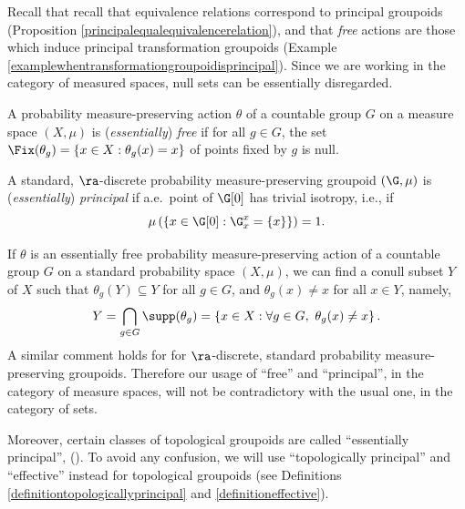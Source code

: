Recall that recall that equivalence relations correspond to principal groupoids (Proposition \ref{principalequalequivalencerelation}), and that \emph{free} actions are those which induce principal transformation groupoids (Example \ref{examplewhentransformationgroupoidisprincipal}). Since we are working in the category of measured spaces, null sets can be essentially disregarded.%

\begin{definition}
A probability measure-preserving action $\theta$ of a countable group $G$ on a measure space $(X,\mu)$ is (\emph{essentially}) \emph{free} if for all $g\in G$, the set $\Fix(\theta_g)=\left\{x\in X:\theta_g(x)=x\right\}$ of points fixed by $g$ is null.
\end{definition}


\begin{definition}
A standard, $\ra$-discrete probability measure-preserving groupoid $(\G,\mu)$ is (\emph{essentially}) \emph{principal} if a.e.\ point of $\G[0]$ has trivial isotropy, i.e., if
\[\mu\left(\left\{x\in\G[0]:\G_x^x=\left\{x\right\}\right\}\right)=1.\]
\end{definition}

\begin{remark}
If $\theta$ is an essentially free probability measure-preserving action of a countable group $G$ on a standard probability space $(X,\mu)$, we can find a conull subset $Y$ of $X$ such that $\theta_g(Y)\subseteq Y$ for all $g\in G$, and $\theta_g(x)\neq x$ for all $x\in Y$, namely,
\[Y=\bigcap_{g\in G}\supp(\theta_g)=\left\{x\in X:\forall g\in G,\ \theta_g(x)\neq x\right\}.\]
A similar comment holds for for $\ra$-discrete, standard probability measure-preserving groupoids. Therefore our usage of ``free'' and ``principal'', in the category of measure spaces, will not be contradictory with the usual one, in the category of sets.

Moreover, certain classes of topological groupoids are called ``essentially principal'', (\cite{MR584266,MR2876963,MR3377390}). To avoid any confusion, we will use ``topologically principal'' and ``effective'' instead for topological groupoids (see Definitions \ref{definitiontopologicallyprincipal} and \ref{definitioneffective}).
\end{remark}

